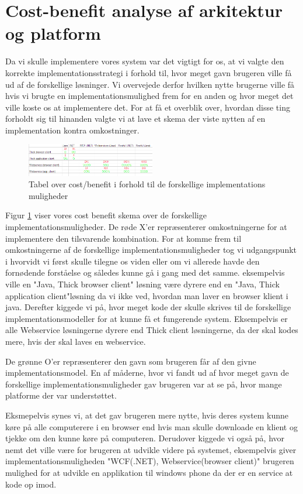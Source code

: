 \section{Cost-benefit analyse af arkitektur og platform}
\label{Cost_Ben}
Da vi skulle implementere vores system var det vigtigt for os, at vi valgte den korrekte implementationsstrategi i forhold til, hvor meget gavn brugeren ville få ud af de forskellige løsninger. Vi overvejede derfor hvilken nytte brugerne ville få hvis vi brugte en implementationsmulighed frem for en anden og hvor meget det ville koste os at implementere det. For at få et overblik over, hvordan disse ting forholdt sig til hinanden valgte vi at lave et skema der viste nytten af en implementation kontra omkostninger.

\begin{figure}[h!]
  \centering
    \includegraphics[width=0.5\textwidth]{Appendix/GUI-Prototype/CostBenefit}
  \caption{Tabel over cost/benefit i forhold til de forskellige implementations muligheder}
\label{Cost_Ben}
\end{figure} 

Figur \ref{Cost_Ben} viser vores cost benefit skema over de forskellige implementationsmuligheder. De røde X'er repræsenterer omkostningerne for at implementere den tilsvarende kombination. For at komme frem til omkostningerne af de forskellige implementationsmuligheder tog vi udgangspunkt i hvorvidt vi først skulle tilegne os viden eller om vi allerede havde den fornødende forståelse og således kunne gå i gang med det samme. eksempelvis ville en "Java, Thick browser client" løsning være dyrere end en "Java, Thick application client"løsning da vi ikke ved, hvordan man laver en browser klient i java. Derefter kiggede vi på, hvor meget kode der skulle skrives til de forskellige implementationsmodeller for at kunne få et fungerende system. Eksempelvis er alle Webservice løsningerne dyrere end Thick client løsningerne, da der skal kodes mere, hvis der skal laves en webservice.


De grønne O'er repræsenterer den gavn som brugeren får af den givne implementationsmodel. En af måderne, hvor vi fandt ud af hvor meget gavn de forskellige implementationsmuligheder gav brugeren var at se på, hvor mange platforme der var understøttet.

Eksmepelvis synes vi, at det gav brugeren mere nytte, hvis deres system kunne køre på alle computerere i en browser end hvis man skulle downloade en klient og tjekke om den kunne køre på computeren. Derudover kiggede vi også på, hvor nemt det ville være for brugeren at udvikle videre på systemet, eksempelvis giver implementationsmuligheden "WCF(.NET), Webservice(browser client)" brugeren mulighed for at udvikle en applikation til windows phone da der er en service at kode op imod.

